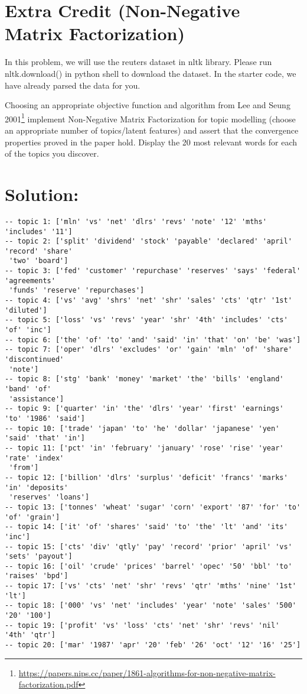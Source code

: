 \documentclass[189]{pset}
\begin{document}
  \clearpage


  \section{Extra Credit (Non-Negative Matrix Factorization)}
    In this problem, we will use the reuters dataset in nltk library.
    Please run nltk.download() in python shell to download the
    dataset. In the starter code, we have already parsed the data for
    you.

    Choosing an appropriate objective function and algorithm from Lee
    and Seung
    2001\footnote{\url{https://papers.nips.cc/paper/1861-algorithms-for-non-negative-matrix-factorization.pdf}}
    implement Non-Negative Matrix Factorization for topic modelling
    (choose an appropriate number of topics/latent features) and
    assert that the convergence properties proved in the paper hold.
    Display the 20 most relevant words for each of the topics you
    discover.

  \hrulefill

  \section*{Solution:}
    \begin{verbatim}
-- topic 1: ['mln' 'vs' 'net' 'dlrs' 'revs' 'note' '12' 'mths' 'includes' '11']
-- topic 2: ['split' 'dividend' 'stock' 'payable' 'declared' 'april' 'record' 'share'
 'two' 'board']
-- topic 3: ['fed' 'customer' 'repurchase' 'reserves' 'says' 'federal' 'agreements'
 'funds' 'reserve' 'repurchases']
-- topic 4: ['vs' 'avg' 'shrs' 'net' 'shr' 'sales' 'cts' 'qtr' '1st' 'diluted']
-- topic 5: ['loss' 'vs' 'revs' 'year' 'shr' '4th' 'includes' 'cts' 'of' 'inc']
-- topic 6: ['the' 'of' 'to' 'and' 'said' 'in' 'that' 'on' 'be' 'was']
-- topic 7: ['oper' 'dlrs' 'excludes' 'or' 'gain' 'mln' 'of' 'share' 'discontinued'
 'note']
-- topic 8: ['stg' 'bank' 'money' 'market' 'the' 'bills' 'england' 'band' 'of'
 'assistance']
-- topic 9: ['quarter' 'in' 'the' 'dlrs' 'year' 'first' 'earnings' 'to' '1986' 'said']
-- topic 10: ['trade' 'japan' 'to' 'he' 'dollar' 'japanese' 'yen' 'said' 'that' 'in']
-- topic 11: ['pct' 'in' 'february' 'january' 'rose' 'rise' 'year' 'rate' 'index'
 'from']
-- topic 12: ['billion' 'dlrs' 'surplus' 'deficit' 'francs' 'marks' 'in' 'deposits'
 'reserves' 'loans']
-- topic 13: ['tonnes' 'wheat' 'sugar' 'corn' 'export' '87' 'for' 'to' 'of' 'grain']
-- topic 14: ['it' 'of' 'shares' 'said' 'to' 'the' 'lt' 'and' 'its' 'inc']
-- topic 15: ['cts' 'div' 'qtly' 'pay' 'record' 'prior' 'april' 'vs' 'sets' 'payout']
-- topic 16: ['oil' 'crude' 'prices' 'barrel' 'opec' '50' 'bbl' 'to' 'raises' 'bpd']
-- topic 17: ['vs' 'cts' 'net' 'shr' 'revs' 'qtr' 'mths' 'nine' '1st' 'lt']
-- topic 18: ['000' 'vs' 'net' 'includes' 'year' 'note' 'sales' '500' '20' '100']
-- topic 19: ['profit' 'vs' 'loss' 'cts' 'net' 'shr' 'revs' 'nil' '4th' 'qtr']
-- topic 20: ['mar' '1987' 'apr' '20' 'feb' '26' 'oct' '12' '16' '25']
\end{verbatim}
\end{document}
